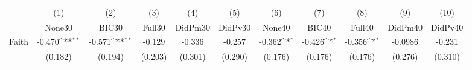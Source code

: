 {
\def\sym#1{\ifmmode^{#1}\else\(^{#1}\)\fi}
\begin{tabular}{l*{10}{c}}
\toprule
            &\multicolumn{1}{c}{(1)}&\multicolumn{1}{c}{(2)}&\multicolumn{1}{c}{(3)}&\multicolumn{1}{c}{(4)}&\multicolumn{1}{c}{(5)}&\multicolumn{1}{c}{(6)}&\multicolumn{1}{c}{(7)}&\multicolumn{1}{c}{(8)}&\multicolumn{1}{c}{(9)}&\multicolumn{1}{c}{(10)}\\
            &\multicolumn{1}{c}{None30}&\multicolumn{1}{c}{BIC30}&\multicolumn{1}{c}{Full30}&\multicolumn{1}{c}{DidPm30}&\multicolumn{1}{c}{DidPv30}&\multicolumn{1}{c}{None40}&\multicolumn{1}{c}{BIC40}&\multicolumn{1}{c}{Full40}&\multicolumn{1}{c}{DidPm40}&\multicolumn{1}{c}{DidPv40}\\
\midrule
Faith       &      -0.470\sym{**} &      -0.571\sym{**} &      -0.129         &      -0.336         &      -0.257         &      -0.362\sym{*}  &      -0.426\sym{*}  &      -0.356\sym{*}  &     -0.0986         &      -0.231         \\
            &     (0.182)         &     (0.194)         &     (0.203)         &     (0.301)         &     (0.290)         &     (0.176)         &     (0.176)         &     (0.176)         &     (0.276)         &     (0.310)         \\
\bottomrule
\end{tabular}
}

